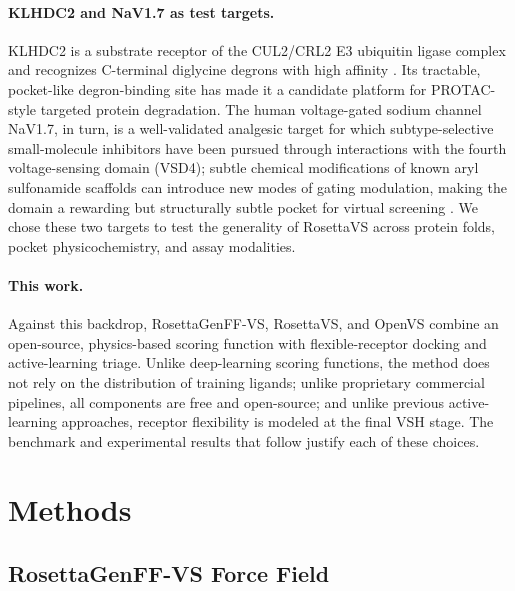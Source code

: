 \documentclass[10pt]{article}
\begin{document}
\paragraph{KLHDC2 and NaV1.7 as test targets.}
KLHDC2 is a substrate receptor of the CUL2/CRL2 E3 ubiquitin ligase complex
and recognizes C-terminal diglycine degrons with high affinity
\citep{slusarz2023klhdc3}. Its tractable, pocket-like degron-binding site
has made it a candidate platform for PROTAC-style targeted protein
degradation. The human voltage-gated sodium channel NaV1.7, in turn, is a
well-validated analgesic target for which subtype-selective small-molecule
inhibitors have been pursued through interactions with the fourth
voltage-sensing domain (VSD4); subtle chemical modifications of known aryl
sulfonamide scaffolds can introduce new modes of gating modulation, making
the domain a rewarding but structurally subtle pocket for virtual screening
\citep{wang2015nav17methyl}. We chose these two targets to test the
generality of RosettaVS across protein folds, pocket physicochemistry, and
assay modalities.

\paragraph{This work.}
Against this backdrop, RosettaGenFF-VS, RosettaVS, and OpenVS combine an
open-source, physics-based scoring function with flexible-receptor docking
and active-learning triage. Unlike deep-learning scoring functions, the
method does not rely on the distribution of training ligands; unlike
proprietary commercial pipelines, all components are free and open-source;
and unlike previous active-learning approaches, receptor flexibility is
modeled at the final VSH stage. The benchmark and experimental results that
follow justify each of these choices.


\section{Methods}

\subsection{RosettaGenFF-VS Force Field}
\end{document}
